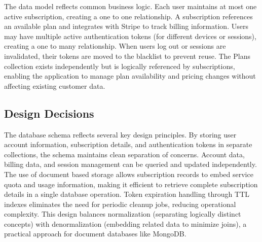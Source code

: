 The data model reflects common business logic. Each user maintains at most one active subscription, creating a one to one relationship. A subscription references an available plan and integrates with Stripe to track billing information. Users may have multiple active authentication tokens (for different devices or sessions), creating a one to many relationship. When users log out or sessions are invalidated, their tokens are moved to the blacklist to prevent reuse. The Plans collection exists independently but is logically referenced by subscriptions, enabling the application to manage plan availability and pricing changes without affecting existing customer data.

\subsection{Design Decisions}

The database schema reflects several key design principles. By storing user account information, subscription details, and authentication tokens in separate collections, the schema maintains clean separation of concerns. Account data, billing data, and session management can be queried and updated independently. The use of document based storage allows subscription records to embed service quota and usage information, making it efficient to retrieve complete subscription details in a single database operation. Token expiration handling through TTL indexes eliminates the need for periodic cleanup jobs, reducing operational complexity. This design balances normalization (separating logically distinct concepts) with denormalization (embedding related data to minimize joins), a practical approach for document databases like MongoDB.
